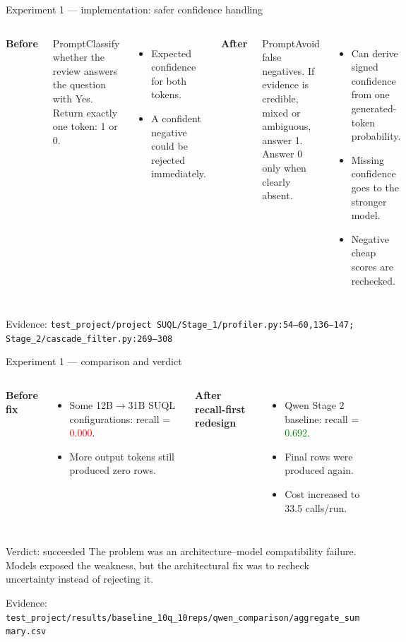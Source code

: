 \documentclass[aspectratio=169,10pt]{beamer}
\newcommand{\yes}[1]{\textcolor{green}{#1}}\newcommand{\no}[1]{\textcolor{red}{#1}}\newcommand{\key}[1]{\textcolor{yellow}{#1}}
\newcommand{\citecode}[1]{\vfill{\color{soft}\tiny Evidence: \texttt{#1}}}
\begin{document}
\begin{frame}{Experiment 1 --- implementation: safer confidence handling}
\begin{columns}[T]\textbf{Before}
\begin{block}{Prompt}\ttfamily\scriptsize Classify whether the review answers\\the question with Yes.\\Return exactly one token: 1 or 0.\end{block}
\begin{itemize}\scriptsize\item Expected confidence for both tokens.\item A confident negative could be rejected immediately.\end{itemize}
\textbf{After}
\begin{block}{Prompt}\ttfamily\scriptsize Avoid false negatives. If evidence is\\credible, mixed or ambiguous, answer 1.\\Answer 0 only when clearly absent.\end{block}
\begin{itemize}\scriptsize\item Can derive signed confidence from one generated-token probability.\item Missing confidence goes to the stronger model.\item Negative cheap scores are rechecked.\end{itemize}\end{columns}
\citecode{test\_project/project SUQL/Stage\_1/profiler.py:54--60,136--147; Stage\_2/cascade\_filter.py:269--308}
\end{frame}

\begin{frame}{Experiment 1 --- comparison and verdict}
\begin{columns}[T]\textbf{Before fix}
\begin{itemize}\item Some 12B$\rightarrow$31B SUQL configurations: recall = \no{0.000}.\item More output tokens still produced zero rows.\end{itemize}
\textbf{After recall-first redesign}
\begin{itemize}\item Qwen Stage 2 baseline: recall = \yes{0.692}.\item Final rows were produced again.\item Cost increased to 33.5 calls/run.\end{itemize}\end{columns}
\vfill
\begin{block}{Verdict: succeeded}
The problem was an architecture--model compatibility failure. Models exposed the weakness, but the architectural fix was to recheck uncertainty instead of rejecting it.
\end{block}
\citecode{test\_project/results/baseline\_10q\_10reps/qwen\_comparison/aggregate\_summary.csv}
\end{frame}
\end{document}
